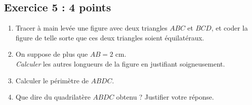 \documentclass[12 pt]{extarticle}
\theoremstyle{plain}
\begin{document}
\subsection*{Exercice 5 : 4 points}

\begin{enumerate}
\item Tracer à main levée une figure avec deux triangles $ABC$ et $BCD$, et coder la figure de telle sorte que ces deux triangles soient équilatéraux. 
\item On suppose de plus que $AB=2$ cm. \\
\emph{Calculer} les autres longueurs de la figure en justifiant soigneusement. 
\item Calculer le périmètre de $ABDC$. 
\item Que dire du quadrilatère $ABDC$ obtenu ? Justifier votre réponse.
\end{enumerate}

 
 	
\end{document}
